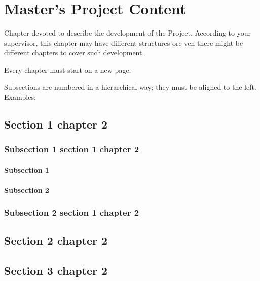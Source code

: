 \chapter{Master’s Project Content}
Chapter devoted to describe the development of the Project. According to your supervisor, this chapter may have different structures ore ven there might be different chapters to cover such development.

Every chapter must start on a new page.

Subsections are numbered in a hierarchical way; they must be aligned to the left. Examples:


\section{Section 1 chapter 2}

\subsection{Subsection 1 section 1 chapter 2}

\subsubsection{Subsection 1}

\subsubsection{Subsection 2}

\subsection{Subsection 2 section 1 chapter 2}

\section{Section 2 chapter 2}

\section{Section 3 chapter	 2}
